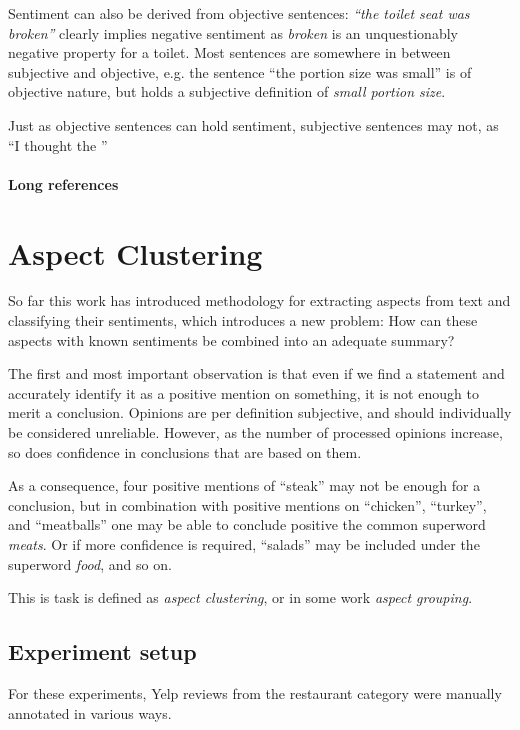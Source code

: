 \documentclass[a4paper,11pt]{kth-mag}
\newcommand{\category}{restaurant category }  %
\begin{document}
Sentiment can also be derived from objective sentences: \emph{``the toilet seat was broken''} clearly implies negative sentiment as \emph{broken} is an unquestionably negative property for a toilet. Most sentences are somewhere in between subjective and objective, e.g. the sentence ``the portion size was small'' is of objective nature, but holds a subjective definition of \emph{small portion size}.

Just as objective sentences can hold sentiment, subjective sentences may not, as ``I thought the ''


\subsubsection{Long references}






\chapter{Aspect Clustering}
So far this work has introduced methodology for extracting aspects from text and classifying their sentiments, which introduces a new problem: How can these aspects with known sentiments be combined into an adequate summary?

The first and most important observation is that even if we find a statement and accurately identify it as a positive mention on something, it is not enough to merit a conclusion. Opinions are per definition subjective, and should individually be considered unreliable. However, as the number of processed opinions increase, so does confidence in conclusions that are based on them.

As a consequence, four positive mentions of ``steak'' may not be enough for a conclusion, but in combination with positive mentions on ``chicken'', ``turkey'',  and ``meatballs'' one may be able to conclude positive the common \gls{superword} \emph{meats}. Or if more confidence is required, ``salads'' may be included under the \gls{superword} \emph{food}, and so on.

This is task is defined as \emph{aspect clustering}, or in some work \emph{aspect grouping}.


\section{Experiment setup}
For these experiments, Yelp reviews from the \category were manually annotated in various ways.
\end{document}
